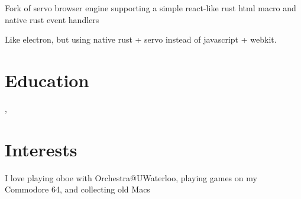 \documentclass[12pt]{jmichaud-resume}
\begin{document}
\iftrue
{} \hfill
{}
\begin{tightemize}
	\item Fork of servo browser engine supporting a simple react-like rust html macro and native rust event handlers
	\item Like electron, but using native rust + servo instead of javascript + webkit. 
\end{tightemize}
\sectionsep
\fi

\iffalse
\runsubsection{Other} \hfill
\location{Scala, Rust, C}

\begin{minipage}[t]{0.49\textwidth}
\begin{tightemize}
	\item\href{https://github.com/justinmichaud/scala-monad-worksheets/}{What is a monad? (Tech Talk + Scala Worksheets)}
\end{tightemize}

\end{minipage}
\hfill
\begin{minipage}[t]{0.49\textwidth}
\begin{tightemize}
	\item\href{https://medium.com/@justin_michaud/super-mario-bros-level-generation-using-torch-rnn-726ddea7e9b7}{Torn-RNN Super Mario Bros Level Generation (Blog post)}
\end{tightemize}
\end{minipage}

\begin{tightemize}
	\item\href{https://github.com/justinmichaud/chocolate-doom}{Pagerduty Doom Mod - Deadliest Incident Management Solution (view and resolve incidents as enemies in-game)}
\end{tightemize}
\sectionsep
\fi

\section{Education} 
,  \hfill {}

\section{Interests}
I love playing oboe with Orchestra@UWaterloo, playing games on my Commodore 64, and collecting old Macs \\
\end{document}
